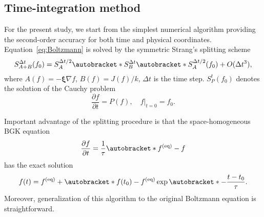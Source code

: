 \documentclass{elsarticle} %
\newcommand{\pder}[2][]{\frac{\partial#1}{\partial#2}}
\newcommand{\OO}[1]{O(#1)}
\DeclarePairedDelimiter\autobracket()       %
\newcommand{\br}[1]{\autobracket*{#1}}
\newcommand{\bxi}{\boldsymbol{\xi}}
\newcommand{\equil}[1]{#1^\mathrm{(eq)}}
\newcommand{\xiai}{\xi_{j \alpha}}
\newcommand{\xiaj}{\xi_{j \beta}}
\begin{document}


\subsection{Time-integration method}\label{sec:numerics:splitting}

For the present study, we start from the simplest numerical algorithm providing the second-order accuracy
for both time and physical coordinates.
Equation~\eqref{eq:Boltzmann} is solved by the symmetric Strang's splitting scheme~\cite{Bobylev2001}
\begin{equation}\label{eq:Strang}
    S^{\Delta{t}}_{A+B}(f_0) = S^{\Delta{t}/2}_A \br{S^{\Delta{t}}_B \br{S^{\Delta{t}/2}_A(f_0)} } + \OO{\Delta{t}^3},
\end{equation}
where \(A(f) = -\bxi\nabla{f}\), \(B(f) = J(f)/k\), \(\Delta{t}\) is the time step.
\(S^t_P (f_0)\) denotes the solution of the Cauchy problem
\begin{equation}\label{eq:Cauchy}
    \pder[f]{t} = P(f), \quad f|_{t=0} = f_0.
\end{equation}

Important advantage of the splitting procedure is that the space-homogeneous BGK equation
\begin{equation}\label{eq:bgk_homogeneous}
    \pder[f]{t} = \frac1\tau \br{\equil{f}-f}
\end{equation}
has the exact solution
\begin{equation}\label{eq:bgk_exact}
    f(t) = \equil{f} + \br{f(t_0)-\equil{f}}\exp\br{-\frac{t-t_0}\tau}.
\end{equation}
Moreover, generalization of this algorithm to the original Boltzmann equation is straightforward.
\end{document}
